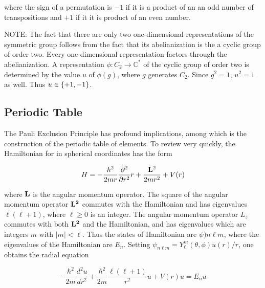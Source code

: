 where the sign of a permutation is $-1$ if it is a product of an an odd number of transpositions and $+1$ if it it is product of an even number.


NOTE: The fact that there are only two one-dimensional representations of the symmetric group follows from the fact that its abelianization is the  a cyclic group of order two.  Every one-dimensional representation factors through the abelianization.  A representation $\phi: C_2 \longrightarrow \mathbb{C}^*$ of the cyclic group of order two is determined by the value  $u$ of $\phi(g)$, where $g$ generates $C_2$.  Since $g^2 = 1$,
$u^2 = 1$ as well.  Thus $u \in \{ +1, -1\}$.





\subsection{Periodic Table}

The Pauli Exclusion Principle has profound implications, among which is the construction of the periodic table of elements.   To review very quickly, the Hamiltonian for in spherical coordinates has the form

\begin{equation}
H = - \frac{ \hbar^2 }{2mr}\frac{ \partial^2 }{ \partial r^2 } r + \frac{{\bf L}^2}{ 2mr^ 2 }  + V(r)
\end{equation}

where $\bf{L}$ is the angular momentum operator.  The square of the angular momentum operator $\bf{L}^2$ commutes with the Hamiltonian and has eigenvalues $\ell(\ell + 1)$, where $\ell \ge 0$ is an integer.  The angular momentum operator $L_z$ commutes with both $\bf{L}^2$ and the Hamiltonian, and has eigenvalues which are integers $m$ with $|m| < \ell$. Thus the states of Hamiltonian are $\psi){n\ell m}$, where the eigenvalues of the Hamiltonian are $E_n$. Setting $\psi_{n\ell m}  = Y^m_\ell(\theta, \phi)u(r)/r$, one obtains the radial equation

\begin{equation}
- \frac{\hbar^2}{2m} \frac{ d^2 u}{ dr^2 }
   + \frac{ \hbar^2 } { 2m } \frac{\ell(\ell + 1)}{ r^2 } u + V(r)u = E_n u
\end{equation}

